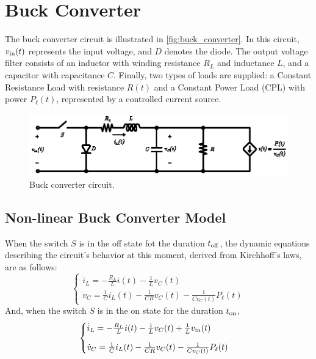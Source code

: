 \section{Buck Converter}

The buck converter circuit is illustrated in \autoref{fig:buck_converter}. In this circuit, $v_{\rm{in}}(t)$ represents the input voltage, and $D$ denotes the diode. The output voltage filter consists of an inductor with winding resistance $R_L$ and inductance $L$, and a capacitor with capacitance $C$. Finally, two types of loads are supplied: a Constant Resistance Load with resistance $R(t)$ and a Constant Power Load (CPL) with power $P_{\ell}(t)$, represented by a controlled current source.

\begin{figure}[h]
  \centering
  \includegraphics[scale=1.]{figures/buck_converter.eps}
  \caption{Buck converter circuit.}
  \label{fig:buck_converter}
\end{figure}

\subsection{Non-linear Buck Converter Model}

When the switch $S$ is in the off state fot the duration $t_{\rm{off}}$, the dynamic equations describing the circuit's behavior at this moment, derived from Kirchhoff's laws, are as follows:
\begin{equation}
  \begin{cases}
    \dot i_L = - \frac{R_L} L i(t) - \frac{1}{L} v_C(t) \\[8pt]
    \dot v_C = \frac{1}{C} i_L(t) - \frac{1}{C R} v_C(t) - \frac{1}{C v_C(t)} P_{\ell}(t)
  \end{cases}
  \label{eq:buck_state_off}
\end{equation}
And, when the switch $S$ is in the on state for the duration $t_{\rm{on}}$,
\begin{equation}
  \begin{cases}
    \dot i_L = - \frac{R_L} L i(t) - \frac{1}{L} v_C(t) + \frac{1}{L} v_{\rm{in}}(t) \\[8pt]
    \dot v_C = \frac{1}{C} i_L(t) - \frac{1}{C R} v_C(t) - \frac{1}{C v_C(t)} P_{\ell}(t)
  \end{cases}
  \label{eq:buck_state_on}
\end{equation}


